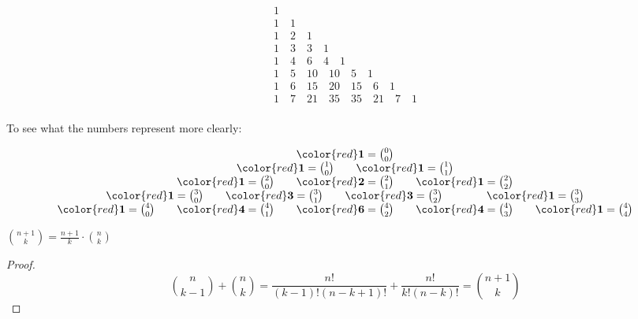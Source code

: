 \documentclass{scrreprt}
\begin{document}
\[
    \begin{array}{c}
        1                                                             \\
        1 \quad 1                                                     \\
        1 \quad 2 \quad 1                                             \\
        1 \quad 3 \quad 3 \quad 1                                     \\
        1 \quad 4 \quad 6 \quad 4 \quad 1                             \\
        1 \quad 5 \quad 10 \quad 10 \quad 5 \quad 1                   \\
        1 \quad 6 \quad 15 \quad 20 \quad 15 \quad 6 \quad 1          \\
        1 \quad 7 \quad 21 \quad 35 \quad 35 \quad 21 \quad 7 \quad 1 \\
    \end{array}
\]

To see what the numbers represent more clearly:

\[
    \begin{array}{c}
        {\color{red}\boldsymbol{1}}=\binom{0}{0}                                                               \\
        {\color{red}\boldsymbol{1}}=\binom{1}{0} \quad\quad{\color{red}\boldsymbol{1}}=\binom{1}{1}            \\
        {\color{red}\boldsymbol{1}}=\binom{2}{0} \quad\quad  {\color{red}\boldsymbol{2}}=\binom{2}{1}
        \quad\quad{\color{red}\boldsymbol{1}}=\binom{2}{2}                                                     \\
        {\color{red}\boldsymbol{1}}=\binom{3}{0} \quad\quad  {\color{red}\boldsymbol{3}}=\binom{3}{1} \quad\quad
        {\color{red}\boldsymbol{3}}=\binom{3}{2} \quad\quad\quad\quad {\color{red}\boldsymbol{1}}=\binom{3}{3} \\
        {\color{red}\boldsymbol{1}}=\binom{4}{0} \quad\quad  {\color{red}\boldsymbol{4}}=\binom{4}{1} \quad\quad
        {\color{red}\boldsymbol{6}}=\binom{4}{2} \quad\quad  {\color{red}\boldsymbol{4}}=\binom{4}{3} \quad\quad
        {\color{red}\boldsymbol{1}}=\binom{4}{4}                                                               \\
    \end{array}
\]

\begin{theorem}
    ${n + 1\choose k} = \frac{n + 1}{k} \cdot {n\choose k}$

    \begin{proof}
        \[
            {n\choose k -1} + {n\choose k} = \frac{n!}{(k-1)!(n-k+1)!} + \frac{n!}{k!(n-k)!} = {n+1\choose k}
        \]
    \end{proof}

\end{theorem}
\end{document}
